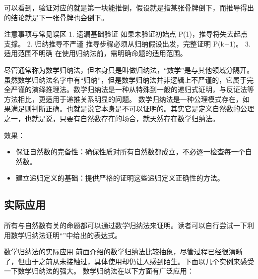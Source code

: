 可以看到，验证对应的就是第一块能推倒，假设就是指某张骨牌倒下，而推导得出的结论就是下一张骨牌也会倒下。

注意事项与常见误区
	1.	遗漏基础验证
如果未验证初始点 P(1)，推导将失去起点支撑。
	2.	归纳推导不严谨
推导步骤必须从归纳假设出发，完整证明 P(k+1)。
	3.	适用范围不明确
在使用归纳法前，需明确命题的适用范围。

尽管通常称为数学归纳法，但本身只是叫做归纳法，“数学”是与其他领域分隔开。虽然数学归纳法名字中有“归纳”，但是数学归纳法并非逻辑上不严谨的，它属于完全严谨的演绎推理法。数学归纳法是一种从特殊到一般的递归式证明，与反证法等方法相比，更适用于递推关系明显的问题。
数学归纳法是一种公理模式存在，如果满足则判断正确。也就是说它本身是不可以证明的。其实它是定义自然数的公理之一，也就是说，只要有自然数存在的场合，就天然存在数学归纳法。

效果：
\begin{itemize}
\item 保证自然数的完备性：确保性质对所有自然数都成立，不必逐一检查每一个自然数。
\item 建立递归定义的基础：提供严格的证明这些递归定义正确性的方法。
\end{itemize}
\subsection{实际应用}


所有与自然数有关的命题都可以通过数学归纳法来证明。读者可以自行尝试一下利用数学归纳法证明“”中给出的表达式。

数学归纳法的实际应用
前面介绍的数学归纳法比较抽象，尽管过程已经很清晰了，但由于之前从未接触过，具体使用却仍让人感到陌生。下面以几个实例来感受一下数学归纳法的强大。
数学归纳法在以下方面有广泛应用：

